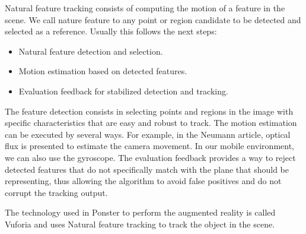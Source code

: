 Natural feature tracking consists of computing the motion of a feature in the
scene\cite{neumann}. We call nature feature to any point or
region candidate to be detected and selected as a reference. Usually this
follows the next steps: 
\begin{itemize}
\item Natural feature detection and selection.
\item Motion estimation based on detected features.
\item Evaluation feedback for stabilized detection and tracking.
\end{itemize}
The feature detection consists in selecting points and regions in the image
with specific characteristics that are easy and robust to track. The motion
estimation can be executed by several ways. For example, in the Neumann
article\cite{neumann}, optical  
flux is presented to estimate the camera movement. In our mobile environment,
we can also use the gyroscope. The evaluation feedback provides a way to reject
detected features that do not specifically match with the plane that should be
representing, thus allowing the algorithm to avoid false positives and do not
corrupt the tracking output.

The technology used in Ponster to perform the augmented reality is called
Vuforia and uses Natural feature tracking to track the object in the scene. 

